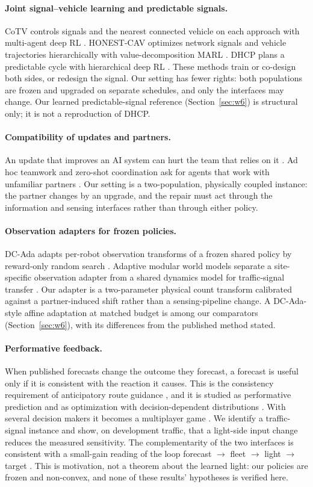 \documentclass[11pt]{article}
\begin{document}
\paragraph{Joint signal--vehicle learning and predictable signals.} CoTV controls signals and the nearest connected vehicle on each
approach with multi-agent deep RL \cite{guo2023}. HONEST-CAV optimizes network signals and vehicle trajectories hierarchically with
value-decomposition MARL \cite{zhang2026}. DHCP plans a predictable cycle with hierarchical deep RL \cite{gu2025}. These methods train or
co-design both sides, or redesign the signal. Our setting has fewer rights: both populations are frozen and upgraded on separate schedules,
and only the interfaces may change. Our learned predictable-signal reference (Section~\ref{sec:w6}) is structural only; it is not a
reproduction of DHCP.
\paragraph{Compatibility of updates and partners.} An update that improves an AI system can hurt the team that relies on it
\cite{bansal2019}. Ad hoc teamwork and zero-shot coordination ask for agents that work with unfamiliar partners
\cite{stone2010,hu2020}. Our setting is a two-population, physically coupled instance: the partner changes by an upgrade, and the repair
must act through the information and sensing interfaces rather than through either policy.
\paragraph{Observation adapters for frozen policies.} DC-Ada adapts per-robot observation transforms of a frozen shared policy by
reward-only random search \cite{alqithami2026}. Adaptive modular world models separate a site-specific observation adapter from a shared
dynamics model for traffic-signal transfer \cite{huang2026}. Our adapter is a two-parameter physical count transform calibrated against a
partner-induced shift rather than a sensing-pipeline change. A DC-Ada-style affine adaptation at matched budget is among our comparators
(Section~\ref{sec:w6}), with its differences from the published method stated.
\paragraph{Performative feedback.} When published forecasts change the outcome they forecast, a forecast is useful only if it is consistent
with the reaction it causes. This is the consistency requirement of anticipatory route guidance \cite{bottom2000}, and it is studied as
performative prediction \cite{perdomo2020} and as optimization with decision-dependent distributions \cite{drusvyatskiy2023}. With several
decision makers it becomes a multiplayer game \cite{narang2023}. We identify a traffic-signal instance and show, on development traffic,
that a light-side input change reduces the measured sensitivity. The complementarity of the two interfaces is consistent with a small-gain
reading of the loop forecast $\to$ fleet $\to$ light $\to$ target \cite{jiang1994,dashkovskiy2007}. This is motivation, not a theorem
about the learned light: our policies are frozen and non-convex, and none of these results' hypotheses is verified here.
\end{document}
